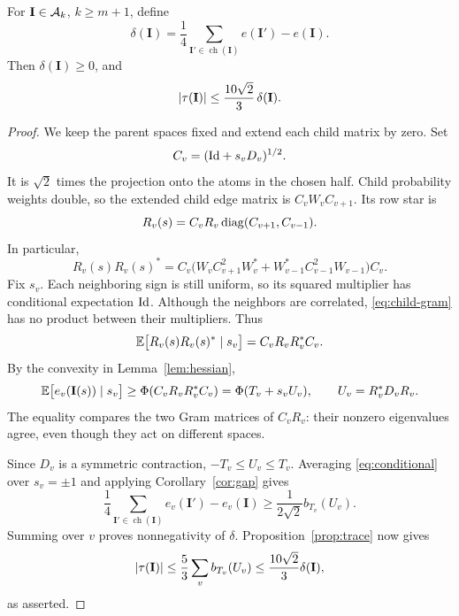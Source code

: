 

\begin{proposition}\label{prop:increase}
For \(\mathbf I\in\mathcal A_k\), \(k\ge m+1\), define
\[
 \delta(\mathbf I)
 =\frac14\sum_{\mathbf I'\in\operatorname{ch}(\mathbf I)}
                     e(\mathbf I')-e(\mathbf I).
\]
Then \(\delta(\mathbf I)\ge0\), and
\begin{equation}\label{eq:local-control}
 \lvert \tau(\mathbf I)\rvert
       \le\frac{10\sqrt2}{3}\,\delta(\mathbf I).
\end{equation}
\end{proposition}

\begin{proof}
We keep the parent spaces fixed and extend each child matrix by zero.
Set
\[
 C_v=(\mathrm{Id}+s_vD_v)^{1/2}.
\]
It is \(\sqrt2\) times the projection onto the atoms in the chosen
half. Child probability weights double, so the extended child edge
matrix is \(C_vW_vC_{v+1}\). Its row star is
\[
 R_v(s)=C_vR_v\operatorname{diag}(C_{v+1},C_{v-1}).
\]
In particular,
\begin{equation}\label{eq:child-gram}
 R_v(s)R_v(s)^*
 =C_v\bigl(
 W_vC_{v+1}^2W_v^*
 +W_{v-1}^*C_{v-1}^2W_{v-1}
 \bigr)C_v.
\end{equation}
Fix \(s_v\). Each neighboring sign is still uniform, so its squared
multiplier has conditional expectation \(\mathrm{Id}\).
Although the neighbors are correlated, \eqref{eq:child-gram} has
no product between their multipliers. Thus
\[
 \mathbb E\bigl[R_v(s)R_v(s)^*\mid s_v\bigr]
       =C_vR_vR_v^*C_v.
\]
By the convexity in Lemma~\ref{lem:hessian},
\begin{equation}\label{eq:conditional}
 \mathbb E\bigl[e_v(\mathbf I(s))\mid s_v\bigr]
       \ge\Phi(C_vR_vR_v^*C_v)
       =\Phi(T_v+s_vU_v),
 \qquad U_v=R_v^*D_vR_v.
\end{equation}
The equality compares the two Gram matrices of \(C_vR_v\):
their nonzero eigenvalues agree, even though they act on different
spaces.

Since \(D_v\) is a symmetric contraction, \(-T_v\le U_v\le T_v\).
Averaging \eqref{eq:conditional} over \(s_v=\pm1\) and applying
Corollary~\ref{cor:gap} gives
\[
 \frac14\sum_{\mathbf I'\in\operatorname{ch}(\mathbf I)}
                     e_v(\mathbf I')-e_v(\mathbf I)
       \ge\frac{1}{2\sqrt2}b_{T_v}(U_v).
\]
Summing over \(v\) proves nonnegativity of \(\delta\).
Proposition~\ref{prop:trace} now gives
\[
 \lvert \tau(\mathbf I)\rvert
 \le\frac53\sum_v b_{T_v}(U_v)
 \le\frac{10\sqrt2}{3}\delta(\mathbf I),
\]
as asserted.
\end{proof}
